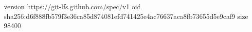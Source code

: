 version https://git-lfs.github.com/spec/v1
oid sha256:d6f888fb579f3e36ca85d874081efd741425e4ac76637aca8fb73655d5e9caf9
size 98400
